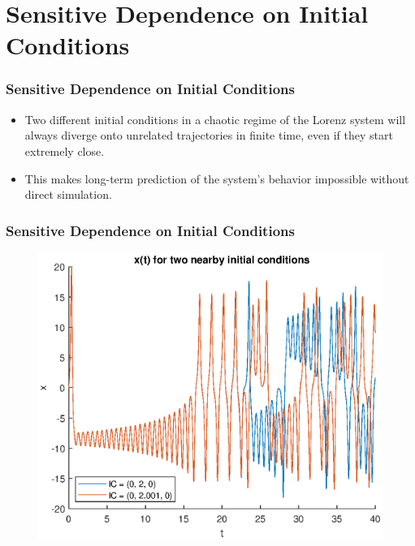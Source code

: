 \documentclass{beamer}
\begin{document}

\section{Sensitive Dependence on Initial Conditions}

\begin{frame}
    \frametitle{Sensitive Dependence on Initial Conditions}
    \begin{itemize}
        \item{Two different initial conditions in a chaotic regime of the Lorenz system will always diverge onto unrelated trajectories in finite time, even if they start extremely close.}
        \item{This makes long-term prediction of the system's behavior impossible without direct simulation.}
    \end{itemize}
\end{frame}


\begin{frame}
    \frametitle{Sensitive Dependence on Initial Conditions}
    \begin{figure}
        \includegraphics[width=0.8\linewidth]{SDOIC}
    \end{figure}
\end{frame}

\end{document}
